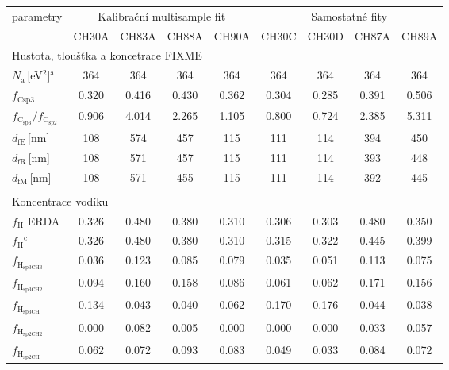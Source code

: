 \begin{tabular}{lcccccccc}
\hline
parametry & \multicolumn{4}{c}{Kalibrační multisample fit} & \multicolumn{4}{c}{Samostatné fity}\\
 & CH30A & CH83A & CH88A & CH90A & CH30C & CH30D & CH87A & CH89A\\
\hline
\multicolumn{9}{l}{Hustota, tloušťka a koncetrace FIXME}\\
\hline
$N_\mathrm{a}$\,[eV$^2$]$^\mathrm{a}$ & 364 & 364 & 364 & 364 & 364 & 364 & 364 & 364\\
$f_\mathrm{Csp3}$ & 0.320 & 0.416 & 0.430 & 0.362 & 0.304 & 0.285 & 0.391 & 0.506\\
$f_\mathrm{C_{sp3}}/f_\mathrm{C_{sp2}}$ & 0.906 & 4.014 & 2.265 & 1.105 & 0.800 & 0.724 & 2.385 & 5.311\\
$d_\mathrm{fE}$\,[nm] & 108 & 574 & 457 & 115 & 111 & 114 & 394 & 450\\
$d_\mathrm{fR}$\,[nm] & 108 & 571 & 457 & 115 & 111 & 114 & 393 & 448\\
$d_\mathrm{fM}$\,[nm] & 108 & 571 & 455 & 115 & 111 & 114 & 392 & 445\\

\multicolumn{9}{l}{}\\
\multicolumn{9}{l}{Koncentrace vodíku}\\
\hline
$f_\mathrm{H}$ ERDA & 0.326 & 0.480 & 0.380 & 0.310 & 0.306 & 0.303 & 0.480 & 0.350\\
$f_\mathrm{H}$$^\mathrm{c}$ & 0.326 & 0.480 & 0.380 & 0.310 & 0.315 & 0.322 & 0.445 & 0.399\\
$f_\mathrm{H_{sp3CH3}}$ & 0.036 & 0.123 & 0.085 & 0.079 & 0.035 & 0.051 & 0.113 & 0.075\\
$f_\mathrm{H_{sp3CH2}}$ & 0.094 & 0.160 & 0.158 & 0.086 & 0.061 & 0.062 & 0.171 & 0.156\\
$f_\mathrm{H_{sp3CH}}$ & 0.134 & 0.043 & 0.040 & 0.062 & 0.170 & 0.176 & 0.044 & 0.038\\
$f_\mathrm{H_{sp2CH2}}$ & 0.000 & 0.082 & 0.005 & 0.000 & 0.000 & 0.000 & 0.033 & 0.057\\
$f_\mathrm{H_{sp2CH}}$ & 0.062 & 0.072 & 0.093 & 0.083 & 0.049 & 0.033 & 0.084 & 0.072\\


\end{tabular}
